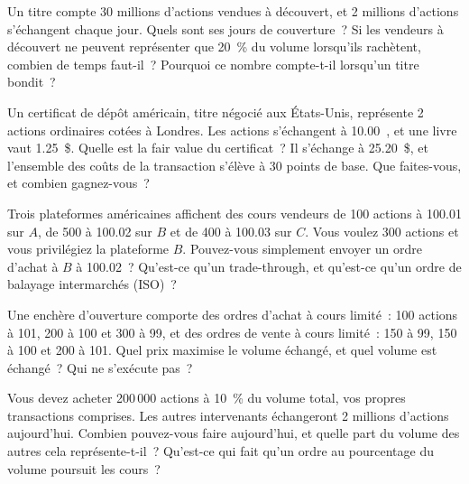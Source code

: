 \begin{question}\label{iq:iv2:markets-and-microstructure:9}
Un titre compte 30 millions d'actions vendues à découvert, et 2 millions d'actions s'échangent chaque jour. Quels sont ses jours de couverture~? Si les vendeurs à découvert ne peuvent représenter que 20~\% du volume lorsqu'ils rachètent, combien de temps faut-il~? Pourquoi ce nombre compte-t-il lorsqu'un titre bondit~?
\end{question}

\begin{question}\label{iq:iv2:markets-and-microstructure:10}
Un certificat de dépôt américain, titre négocié aux États-Unis, représente 2 actions ordinaires cotées à Londres. Les actions s'échangent à 10.00~\textsterling, et une livre vaut 1.25~\$. Quelle est la fair value du certificat~? Il s'échange à 25.20~\$, et l'ensemble des coûts de la transaction s'élève à 30 points de base. Que faites-vous, et combien gagnez-vous~?
\end{question}

\begin{question}\label{iq:iv2:markets-and-microstructure:11}
Trois plateformes américaines affichent des cours vendeurs de 100 actions à 100.01 sur $A$, de 500 à 100.02 sur $B$ et de 400 à 100.03 sur $C$. Vous voulez 300 actions et vous privilégiez la plateforme $B$. Pouvez-vous simplement envoyer un ordre d'achat à $B$ à 100.02~? Qu'est-ce qu'un trade-through, et qu'est-ce qu'un ordre de balayage intermarchés (ISO)~?
\end{question}

\begin{question}\label{iq:iv2:markets-and-microstructure:12}
Une enchère d'ouverture comporte des ordres d'achat à cours limité~: 100 actions à 101, 200 à 100 et 300 à 99, et des ordres de vente à cours limité~: 150 à 99, 150 à 100 et 200 à 101. Quel prix maximise le volume échangé, et quel volume est échangé~? Qui ne s'exécute pas~?
\end{question}

\begin{question}\label{iq:iv2:markets-and-microstructure:13}
Vous devez acheter 200\,000 actions à 10~\% du volume total, vos propres transactions comprises. Les autres intervenants échangeront 2 millions d'actions aujourd'hui. Combien pouvez-vous faire aujourd'hui, et quelle part du volume des autres cela représente-t-il~? Qu'est-ce qui fait qu'un ordre au pourcentage du volume poursuit les cours~?
\end{question}

